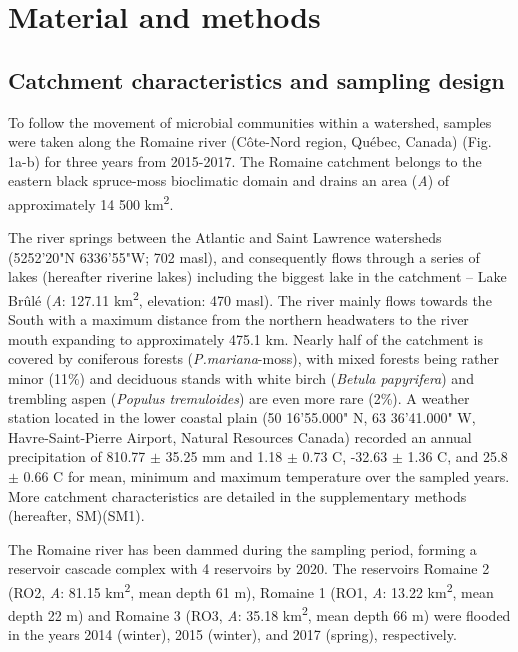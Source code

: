 \documentclass[12pt,a4paper]{article} %
\begin{document}
\section*{Material and methods}
\subsection*{Catchment characteristics and sampling design}
To follow the movement of microbial communities within a watershed, samples were taken along the Romaine river (C\^{o}te-Nord region, Qu\'{e}bec, Canada) (Fig. 1a-b) for three years from 2015-2017. The Romaine catchment belongs to the eastern black spruce-moss bioclimatic domain and drains an area (\textit{A}) of approximately 14 500 km\textsuperscript{2}.

The river springs between the Atlantic and Saint Lawrence watersheds (52\textdegree{}52'20"N 63\textdegree{}36'55"W; 702 masl), and consequently flows through a series of lakes (hereafter riverine lakes) including the biggest lake in the catchment – Lake Br\^{u}l\'{e} (\textit{A}: 127.11 km\textsuperscript{2}, elevation: 470 masl). The river mainly flows towards the South with a maximum distance from the northern headwaters to the river mouth expanding to approximately 475.1 km. Nearly half of the catchment is covered by coniferous forests (\textit{P.mariana}-moss), with mixed forests being rather minor (11\%) and deciduous stands with white birch (\textit{Betula papyrifera}) and trembling aspen (\textit{Populus tremuloides}) are even more rare (2\%)\citep{HQreport2009}.  A weather station located in the lower coastal plain (50\textdegree{} 16'55.000" N, 63\textdegree{} 36'41.000" W, Havre-Saint-Pierre Airport, Natural Resources Canada) recorded an annual precipitation of 810.77 $\pm$ 35.25 mm and 1.18 $\pm$ 0.73 \textdegree{}C, -32.63 $\pm$ 1.36 \textdegree{}C, and 25.8 $\pm$ 0.66 \textdegree{}C for mean, minimum and maximum temperature over the sampled years. More catchment characteristics are detailed in the supplementary methods (hereafter, SM)(SM1).

The Romaine river has been dammed during the sampling period, forming a reservoir cascade complex with 4 reservoirs by 2020. The reservoirs Romaine 2 (RO2, \textit{A}: 81.15 km\textsuperscript{2}, mean depth 61 m), Romaine 1 (RO1, \textit{A}: 13.22 km\textsuperscript{2}, mean depth 22 m) and Romaine 3 (RO3, \textit{A}: 35.18 km\textsuperscript{2}, mean depth 66 m) were flooded in the years 2014 (winter), 2015 (winter), and 2017 (spring), respectively.
\end{document}
